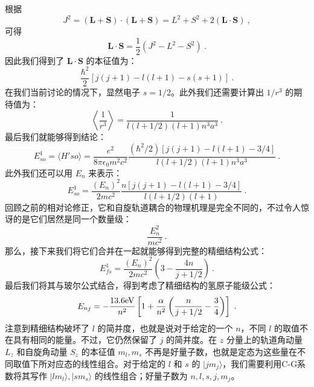 根据
\begin{equation}
J^2 = (\mathbf{L+S})\cdot(\mathbf{L+S})=L^2+S^2+2(\mathbf{L\cdot S})~,
\end{equation}
可得
\begin{equation}
\mathbf{L\cdot S}=\frac{1}{2}(J^2-L^2-S^2)~.
\end{equation}
因此我们得到了 $\mathbf{L\cdot S}$ 的本征值为：
\begin{equation}
\frac{\hbar^2}{2}[j(j+1)-l(l+1)-s(s+1)]~.
\end{equation}
在我们当前讨论的情况下，显然电子 $s=1/2$。此外我们还需要计算出 $1/r^3$ 的期待值为：
\begin{equation}
\left\langle \frac{1}{r^3}\right\rangle = \frac{1}{l(l+1/2)(l+1)n^3a^3}~.
\end{equation}
最后我们就能够得到结论：
\begin{equation}
E^1_{so}=\langle H'{so}\rangle = \frac{e^2}{8\pi \epsilon_0 m^2 c^2}\frac{(\hbar^2/2)[j(j+1)-l(l+1)-3/4]}{l(l+1/2)(l+1)n^3a^3}~.
\end{equation}
此外我们还可以用 $E_n$ 来表示：
\begin{equation}
E^1_{so}=\frac{(E_n)^2}{2mc^2}\frac{n[j(j+1)-l(l+1)-3/4]}{l(l+1/2)(l+1)}~.
\end{equation}
回顾之前的相对论修正，它和自旋轨道耦合的物理机理是完全不同的，不过令人惊讶的是它们居然是同一个数量级：
\begin{equation}
\frac{E_n^2}{mc^2}~.
\end{equation}
那么，接下来我们将它们合并在一起就能够得到完整的精细结构公式：
\begin{equation}
E_{fs}^1=\frac{(E_n)^2}{2mc^2}\left(3-\frac{4n}{j+1/2}\right)~.
\end{equation}
最后我们将其与玻尔公式结合，得到考虑了精细结构的氢原子能级公式：
\begin{equation}
E_{nj}=-\frac{13.6\rm{eV}}{n^2}\left[1+\frac{\alpha}{n^2}\left(\frac{n}{j+1/2}-\frac{3}{4}\right)\right]~.
\end{equation}
注意到精细结构破坏了 $l$ 的简并度，也就是说对于给定的一个 $n$，不同 $l$ 的取值不在具有相同的能量。不过，它仍然保留了 $j$ 的简并度。在 $z$ 分量上的轨道角动量 $L_z$ 和自旋角动量 $S_z$ 的本征值 $m_l,m_s$ 不再是好量子数，也就是定态为这些量在不同取值下所对应态的线性组合。对于给定的 $l$ 和 $s$ 的 $|jm_j\rangle$，我们需要利用C-G系数将其写作 $|lm_l\rangle,|sm_s\rangle$ 的线性组合；好量子数为 $n,l,s,j,m_j$。





